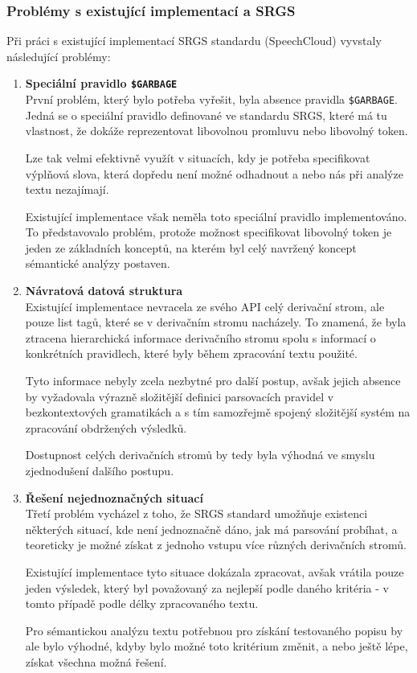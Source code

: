 \subsubsection{Problémy s existující implementací a SRGS}
Při práci s existující implementací SRGS standardu (SpeechCloud)
vyvstaly následující problémy:
\begin{enumerate}
	\item \textbf{Speciální pravidlo \texttt{\$GARBAGE}}\\
	      První problém, který bylo potřeba vyřešit, byla absence pravidla \texttt{\$GARBAGE}.
	      Jedná se o speciální pravidlo definované ve standardu SRGS, které má tu vlastnost, že dokáže reprezentovat libovolnou promluvu nebo libovolný token.

	      Lze tak velmi efektivně využít v situacích, kdy je potřeba specifikovat výplňová slova,
	      která dopředu není možné odhadnout a nebo nás při analýze textu nezajímají.

	      Existující implementace však neměla toto speciální pravidlo implementováno.
	      To představovalo problém, protože možnost specifikovat libovolný token je jeden ze základních konceptů,
	      na kterém byl celý navržený koncept sémantické analýzy postaven.
	\item \textbf{Návratová datová struktura}\\
	      Existující implementace nevracela ze svého API celý derivační strom, ale pouze list tagů, které se v derivačním stromu nacházely.
	      To znamená, že byla ztracena hierarchická informace derivačního stromu spolu s informací o konkrétních pravidlech,
	      které byly během zpracování textu použité.

	      Tyto informace nebyly zcela nezbytné pro další postup, avšak jejich absence by
	      vyžadovala výrazně složitější definici parsovacích pravidel v bezkontextových gramatikách a
	      s tím samozřejmě spojený složitější systém na zpracování obdržených výsledků.

	      Dostupnost celých derivačních stromů by tedy byla výhodná ve smyslu zjednodušení dalšího postupu.
	\item \textbf{Řešení nejednoznačných situací}\\
	      Třetí problém vycházel z toho, že SRGS standard umožňuje existenci některých situací,
	      kde není jednoznačně dáno, jak má parsování probíhat,
	      a teoreticky je možné získat z jednoho vstupu více různých derivačních stromů.


	      Existující implementace tyto situace dokázala zpracovat, avšak vrátila pouze jeden výsledek,
	      který byl považovaný za nejlepší podle daného kritéria - v tomto případě podle délky zpracovaného textu.

	      Pro sémantickou analýzu textu potřebnou pro získání testovaného popisu by ale bylo výhodné,
	      kdyby bylo možné toto kritérium změnit, a nebo ještě lépe, získat všechna možná řešení.
\end{enumerate}

